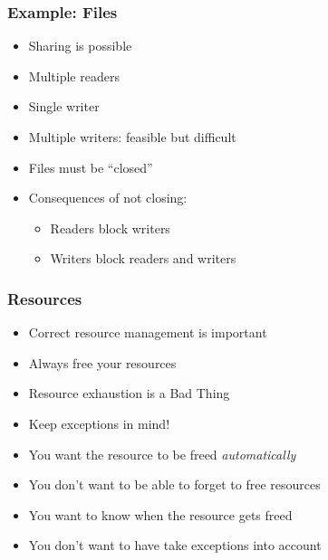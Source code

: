 \begin{frame}
  \frametitle{Example: Files}
  \begin{itemize}
    \item Sharing is possible
    \item Multiple readers
    \item Single writer
    \item Multiple writers: feasible but difficult
    \item Files must be ``closed''
    \item Consequences of not closing:
          \begin{itemize}
            \item Readers block writers
            \item Writers block readers and writers
          \end{itemize}
  \end{itemize}
\end{frame}

\begin{frame}
  \frametitle{Resources}
  \begin{itemize}
    \item Correct resource management is important
    \item Always free your resources
    \item Resource exhaustion is a Bad Thing
    \item Keep exceptions in mind!
  \end{itemize}
  \vskip5mm
  \begin{itemize}
    \item You want the resource to be freed \emph{automatically}
    \item You don't want to be able to forget to free resources
    \item You want to know when the resource gets freed
    \item You don't want to have take exceptions into account
  \end{itemize}
\end{frame}


